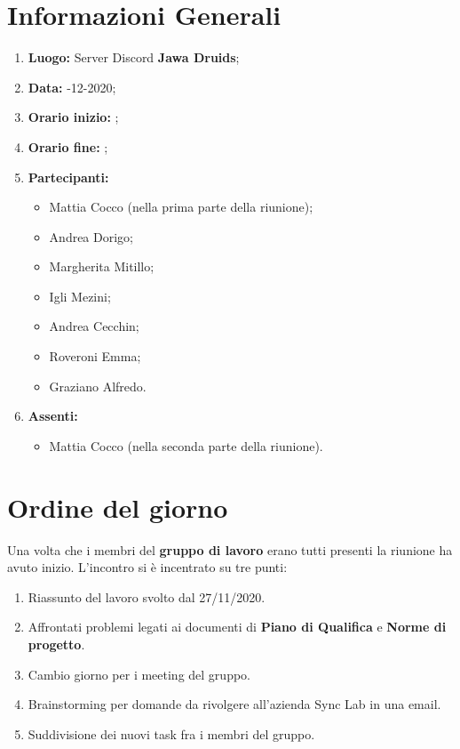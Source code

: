 \newpage
	\section{Informazioni Generali}
	\begin{enumerate}
		\item \textbf{Luogo:} \normalfont Server Discord \textbf{Jawa Druids};
		\item \textbf{Data:} -12-2020;
		\item \textbf{Orario inizio:} ;
		\item \textbf{Orario fine:} ;
		\item \textbf{Partecipanti:}
		\begin{itemize}
			\item Mattia Cocco (nella prima parte della riunione); 
			\item Andrea Dorigo;
			\item Margherita Mitillo;
			\item Igli Mezini;
			\item Andrea Cecchin;
			\item Roveroni Emma;
			\item Graziano Alfredo.
		\end{itemize}
		\item \textbf{Assenti:}
		\begin{itemize}
			\item Mattia Cocco (nella seconda parte della riunione).
		\end{itemize}
	\end{enumerate}
	
	\section{Ordine del giorno}
	Una volta che i membri del \textbf{gruppo di lavoro} erano tutti presenti la riunione ha avuto inizio.
	L'incontro si è incentrato su tre punti:
	\begin{enumerate}
		\item Riassunto del lavoro svolto dal 27/11/2020.
		
		\item Affrontati problemi legati ai documenti di \textbf{Piano di Qualifica} e \textbf{Norme di progetto}.
		
		\item Cambio giorno per i meeting del gruppo.
		
		\item Brainstorming per domande da rivolgere all'azienda Sync Lab in una email.
		
		\item Suddivisione dei nuovi task fra i membri del gruppo.
	\end{enumerate}
